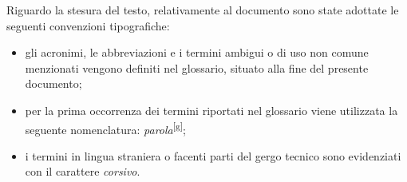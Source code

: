 Riguardo la stesura del testo, relativamente al documento sono state adottate le seguenti convenzioni tipografiche:
\begin{itemize}
	\item gli acronimi, le abbreviazioni e i termini ambigui o di uso non comune menzionati vengono definiti nel glossario, situato alla fine del presente documento;
	\item per la prima occorrenza dei termini riportati nel glossario viene utilizzata la seguente nomenclatura: \emph{parola}\textsuperscript{[g]};
	\item i termini in lingua straniera o facenti parti del gergo tecnico sono evidenziati con il carattere \emph{corsivo}.
\end{itemize}